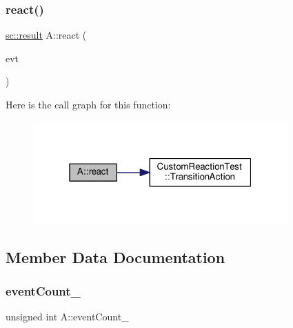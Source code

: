 \subsubsection{\texorpdfstring{react()}{react()}\hspace{0.1cm}{\footnotesize\ttfamily [11/11]}}
{\footnotesize\ttfamily \mbox{\hyperlink{namespaceboost_1_1statechart_abe807f6598b614d6d87bb951ecd92331}{sc\+::result}} A\+::react (\begin{DoxyParamCaption}\item[{const \mbox{\hyperlink{struct_ev_transit_with_action}{Ev\+Transit\+With\+Action}} \&}]{evt }\end{DoxyParamCaption})\hspace{0.3cm}{\ttfamily [inline]}}

Here is the call graph for this function\+:
\nopagebreak
\begin{figure}[H]
\begin{center}
\leavevmode
\includegraphics[width=277pt]{struct_a_a22e1cf6871b994db83aec743fbf6f5d0_cgraph}
\end{center}
\end{figure}


\subsection{Member Data Documentation}
\mbox{\label{struct_a_a3c06744fc190a128fd536cf61f15e88b}} 
\subsubsection{\texorpdfstring{event\+Count\+\_\+}{eventCount\_}}
{\footnotesize\ttfamily unsigned int A\+::event\+Count\+\_\+}



